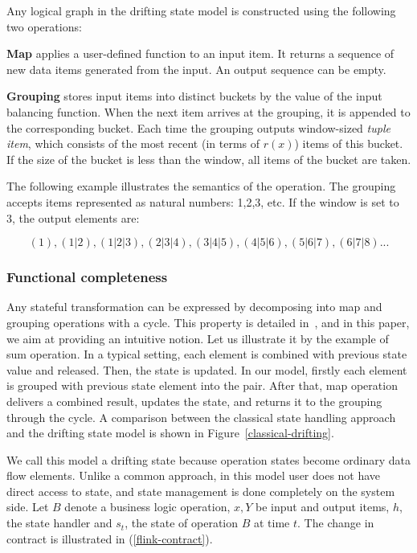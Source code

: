 Any logical graph in the drifting state model is constructed using the following two operations:

{\bf Map} applies a user-defined function to an input item. It returns a sequence of new data items generated from the input. An output sequence can be empty.

{\bf Grouping} stores input items into distinct buckets by the value of the input balancing function. When the next item arrives at the grouping, it is appended to the corresponding bucket. Each time the grouping outputs window-sized {\it tuple item}, which consists of the most recent (in terms of $r(x)$) items of this bucket. If the size of the bucket is less than the window, all items of the bucket are taken.

The following example illustrates the semantics of the operation. The grouping accepts items represented as natural numbers: 1,2,3, etc. If the window is set to 3, the output elements are:

\[(1), (1|2), (1|2|3), (2|3|4), (3|4|5), (4|5|6), (5|6|7), (6|7|8)...\]

\subsubsection{Functional completeness}

Any stateful transformation can be expressed by decomposing into map and grouping operations with a cycle. This property is detailed in~\cite{we2018adbis}, and in this paper, we aim at providing an intuitive notion. Let us illustrate it by the example of sum operation. In a typical setting, each element is combined with previous state value and released. Then, the state is updated. In our model, firstly each element is grouped with previous state element into the pair. After that, map operation delivers a combined result, updates the state, and returns it to the grouping through the cycle. A comparison between the classical state handling approach and the drifting state model is shown in Figure~\ref{classical-drifting}.

We call this model a drifting state because operation states become ordinary data flow elements. Unlike a common approach, in this model user does not have direct access to state, and state management is done completely on the system side. Let $B$ denote a business logic operation, $x, Y$ be input and output items, $h$, the state handler and $s_t$, the state of operation $B$ at time $t$. The change in contract is illustrated in (\ref{flink-contract}).

